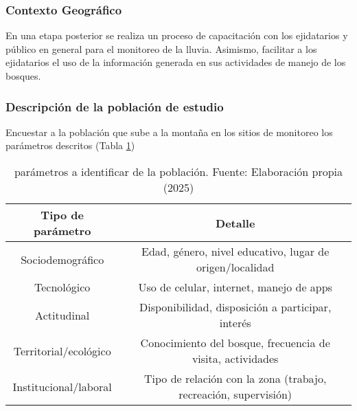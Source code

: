 \subsubsection*{Contexto Geográfico}



En una etapa posterior se realiza un proceso de capacitación con los ejidatarios y público en general para el monitoreo de la lluvia. Asimismo, facilitar a los ejidatarios el uso de la información generada en sus actividades de manejo de los bosques.

\subsubsection*{Descripción de la población de estudio}

Encuestar a la población que sube a la montaña en los sitios de monitoreo los parámetros descritos (Tabla \ref{tabt3})
\begin{table}[h!]
\centering
\begin{tabular}{@{}cc@{}}
\toprule
Tipo de parámetro & Detalle                                           \\ \midrule
Sociodemográfico      & Edad, género, nivel educativo, lugar de origen/localidad          \\
Tecnológico       & Uso de celular, internet, manejo de apps          \\
Actitudinal       & Disponibilidad, disposición a participar, interés \\
Territorial/ecológico & Conocimiento del bosque, frecuencia de visita, actividades      \\
Institucional/laboral & Tipo de relación con la zona (trabajo, recreación, supervisión) \\ \bottomrule
\end{tabular}
\caption{parámetros a identificar de la población. Fuente: Elaboración propia (2025)}
\label{tabt3}
\end{table}






